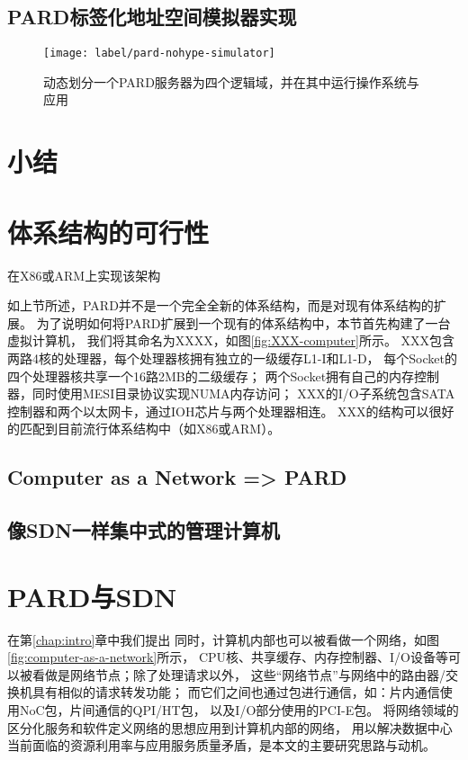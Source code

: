 \subsection{PARD标签化地址空间模拟器实现}



\begin{figure}[tb]
  \centering
  \texttt{[image: label/pard-nohype-simulator]}
  \caption{动态划分一个PARD服务器为四个逻辑域，并在其中运行操作系统与应用}
  \label{fig:pard-nohype-simulator}
\end{figure}

\section{小结}



\section{体系结构的可行性}

在X86或ARM上实现该架构


如上节所述，PARD并不是一个完全全新的体系结构，而是对现有体系结构的扩展。
为了说明如何将PARD扩展到一个现有的体系结构中，本节首先构建了一台虚拟计算机，
我们将其命名为XXXX，如图\ref{fig:XXX-computer}所示。
XXX包含两路4核的处理器，每个处理器核拥有独立的一级缓存L1-I和L1-D，
每个Socket的四个处理器核共享一个16路2MB的二级缓存；
两个Socket拥有自己的内存控制器，同时使用MESI目录协议实现NUMA内存访问；
XXX的I/O子系统包含SATA控制器和两个以太网卡，通过IOH芯片与两个处理器相连。
XXX的结构可以很好的匹配到目前流行体系结构中（如X86或ARM）。

\subsection{Computer as a Network => PARD}

\subsection{像SDN一样集中式的管理计算机}

\section{PARD与SDN}

在第\ref{chap:intro}章中我们提出
同时，计算机内部也可以被看做一个网络，如图\ref{fig:computer-as-a-network}所示，
CPU核、共享缓存、内存控制器、I/O设备等可以被看做是网络节点；除了处理请求以外，
这些``网络节点''与网络中的路由器/交换机具有相似的请求转发功能；
而它们之间也通过包进行通信，如：片内通信使用NoC包，片间通信的QPI/HT包，
以及I/O部分使用的PCI-E包。
将网络领域的区分化服务和软件定义网络的思想应用到计算机内部的网络，
用以解决数据中心当前面临的资源利用率与应用服务质量矛盾，是本文的主要研究思路与动机。

